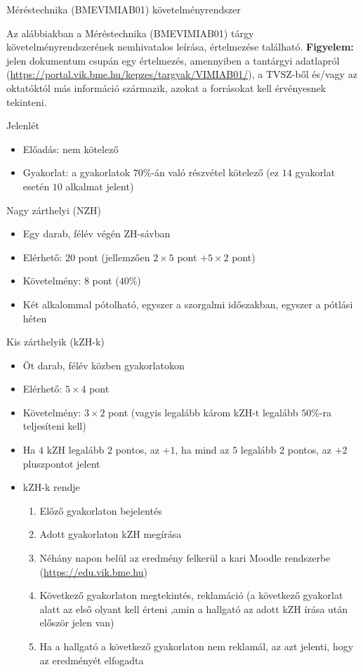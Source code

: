 \documentclass[a4paper,12pt]{article}
\begin{document}
	\begin{center}
		\LARGE Méréstechnika (BMEVIMIAB01) követelményrendszer
	\end{center}
	Az alábbiakban a Méréstechnika (BMEVIMIAB01) tárgy követelményrendszerének nemhivatalos leírása, értelmezése található. \textbf{Figyelem:} jelen dokumentum csupán egy értelmezés, amennyiben a tantárgyi adatlapról (\url{https://portal.vik.bme.hu/kepzes/targyak/VIMIAB01/}), a TVSZ-ből és/vagy az oktatóktól más információ származik, azokat a forrásokat kell érvényesnek tekinteni.
	
	Jelenlét
	\begin{itemize}
		\item Előadás: nem kötelező
		\item Gyakorlat: a gyakorlatok $70\%$-án való részvétel kötelező (ez $14$ gyakorlat esetén $10$ alkalmat jelent)
	\end{itemize}
	Nagy zárthelyi (NZH)
	\begin{itemize}
		\item Egy darab, félév végén ZH-sávban
		\item Elérhető: $20$ pont (jellemzően $2\times5$ pont $+5\times2$ pont)
		\item Követelmény: $8$ pont ($40\%$)
		\item Két alkalommal pótolható, egyszer a szorgalmi időszakban, egyszer a pótlási héten
	\end{itemize}
	Kis zárthelyik (kZH-k)
	\begin{itemize}
		\item Öt darab, félév közben gyakorlatokon
		\item Elérhető: $5\times4$ pont
		\item Követelmény: $3\times2$ pont (vagyis legalább károm kZH-t legalább $50\%$-ra teljesíteni kell)
		\item Ha $4$ kZH legalább $2$ pontos, az $+1$, ha mind az $5$ legalább $2$ pontos, az $+2$ pluszpontot jelent
		\item kZH-k rendje
		\begin{enumerate}
			\item Előző gyakorlaton bejelentés
			\item Adott gyakorlaton kZH megírása
			\item Néhány napon belül az eredmény felkerül a kari Moodle rendszerbe (\url{https://edu.vik.bme.hu})
			\item Következő gyakorlaton megtekintés, reklamáció (a következő gyakorlat alatt az első olyant kell érteni ,amin a hallgató az adott kZH írása után először jelen van)
			\item Ha a hallgató a következő gyakorlaton nem reklamál, az azt jelenti, hogy az eredményét elfogadta
		\end{enumerate}
	\end{itemize}
\end{document}

